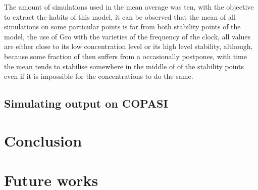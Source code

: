 \documentclass[12pt]{article}
\begin{document}
    The amount of simulations used in the mean average was ten, with the objective to extract the habits of this model, it can be observed that the mean of all simulations on some particular points is far from both stability points of the model, the use of Gro with the varieties of the frequency of the clock, all values are either close to its low concentration level or its high level stability, although, because some fraction of then suffers from a occasionally postpones, with time the mean tends to stabilise somewhere in the middle of of the stability points even if it is impossible for the concentrations to do the same.

\subsection{Simulating output on COPASI}
    \lipsum[1]

\section{Conclusion}
    \lipsum[1]
    
\section{Future works}
    \lipsum[1]



\end{document}
